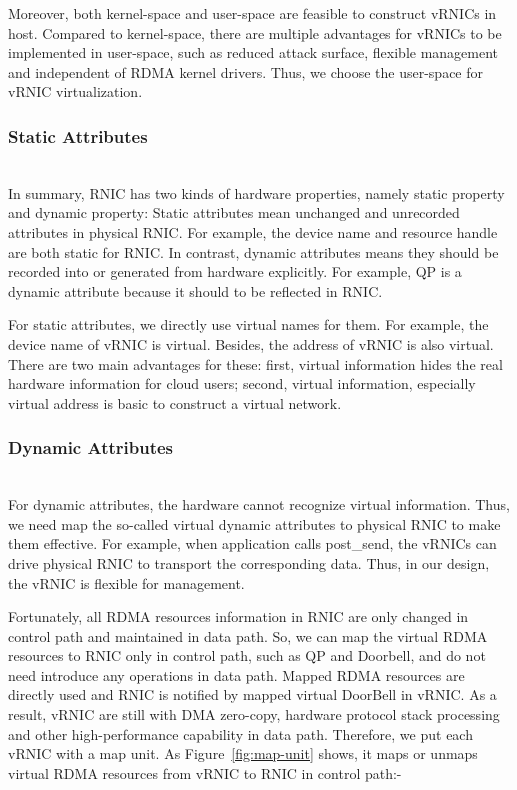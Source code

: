 Moreover, both kernel-space and user-space are feasible to construct vRNICs in host. Compared to kernel-space, there are multiple advantages for vRNICs to be implemented in user-space, such as reduced attack surface, flexible management and independent of RDMA kernel drivers. Thus, we choose the user-space for vRNIC virtualization.

\subsubsection{Static Attributes} ~\\
In summary, RNIC has two kinds of hardware properties, namely static property and dynamic property: Static attributes mean unchanged and unrecorded attributes in physical RNIC. For example, the device name and resource handle are both static for RNIC. In contrast, dynamic attributes means they should be recorded into or generated from hardware explicitly. For example, QP is a dynamic attribute because it should to be reflected in RNIC.

For static attributes, we directly use virtual names for them. For example, the device name of vRNIC is virtual. Besides, the address of vRNIC is also virtual. There are two main advantages for these: first, virtual information hides the real hardware information for cloud users; second, virtual information, especially virtual address is basic to construct a virtual network. 
\subsubsection{Dynamic Attributes} ~\\
For dynamic attributes, the hardware cannot recognize virtual information. Thus, we need map the so-called virtual dynamic attributes to physical RNIC to make them effective. For example, when application calls post\_send, the vRNICs can drive physical RNIC to transport the corresponding data. Thus, in our design, the vRNIC is flexible for management. 

Fortunately, all RDMA resources information in RNIC are only changed in control path and maintained in data path. So, we can map the virtual RDMA resources to RNIC only in control path, such as QP and Doorbell,  and do not need introduce any operations in data path. Mapped RDMA resources are directly used and RNIC is notified by mapped virtual DoorBell in vRNIC. As a result, vRNIC are still with DMA zero-copy, hardware protocol stack processing and other high-performance capability in data path. Therefore, we put each vRNIC with a map unit. As Figure~\ref{fig:map-unit} shows, it maps or unmaps virtual RDMA resources from vRNIC to RNIC in control path:-


